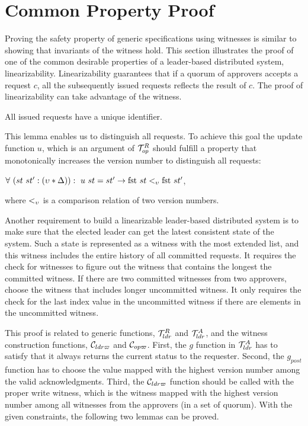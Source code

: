 \section{Common Property Proof}
\label{chapter:witnesspassing:sec:prove-safety-with-witness}

Proving the safety property of generic specifications using witnesses is similar to showing that invariants of the witness hold.
This section illustrates the proof of one of the common desirable properties
of a leader-based distributed system, linearizability.
Linearizability guarantees that if a quorum of approvers accepts a request $c$, 
all the subsequently issued requests reflects the result of $c$. 
The proof of linearizability can take advantage of the witness. 

\begin{lemma}
All issued requests have a unique identifier.
\end{lemma}

This lemma enables us to distinguish all requests. To achieve this goal the 
update function $u$, which is an argument of $\mathcal{T}^{R}_{op}$ should fulfill a 
property that monotonically increases the version number to distinguish all
requests:
\begin{center}
$\forall \ (st \ st' : (\upsilon * \Delta)) : \ u \ st = st' \rightarrow \text{fst }st
<_{\upsilon}  \text{fst }st'$,
\end{center}
where $<_{\upsilon}$ is a comparison relation of two version numbers.


Another requirement to build a linearizable leader-based distributed system is to make sure that the elected leader can get the latest consistent
state of the system. Such a state is represented as a witness with the most extended list, and this witness includes the entire history of all committed requests. 
It requires the check for witnesses to figure out the witness that contains the longest the committed witness. If there are two committed witnesses from two approvers, choose the witness that includes longer uncommitted witness. It only requires the check for the last index value in the uncommitted witness if there are elements in the uncommitted witness.


This proof is related to generic functions, $\mathcal{T}^{R}_{ldr}$ and $\mathcal{T}^{A}_{ldr}$, 
and the witness construction functions, $\mathcal{C}_{ldr\varpi}$ and $\mathcal{C}_{op\varpi}$.
First, the $g$ function in $\mathcal{T}^{A}_{ldr}$ has to satisfy that  
it always returns the current status to the requester.
Second, the $g_{post}$ function has to choose the value mapped with the highest version number among the valid acknowledgments. 
Third, the $\mathcal{C}_{ldr\varpi}$ function should be called with the proper write witness, which is the witness mapped with the highest version number among all witnesses from the approvers (in a set of quorum).
With the given constraints, the following two lemmas can be proved.

